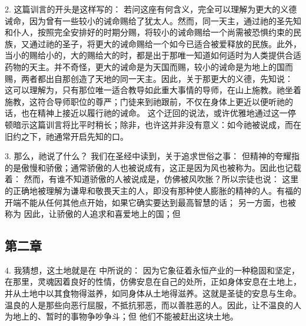 2. 这篇训言的开头是这样写的： 若问这座有何含义，完全可以理解为更大的义德诫命，因为曾有一些较小的诫命赐给了犹太人。然而，同一天主，通过祂的圣先知和仆人，按照完全安排好的时期分赐，将较小的诫命赐给一个尚需被恐惧约束的民族，又通过祂的圣子，将更大的诫命赐给一个如今已适合被爱释放的民族。此外，当小的赐给小的，大的赐给大的时，都是出于那唯一知道如何适时为人类提供合适药物的天主。并不奇怪，更大的诫命是为天国而赐，较小的诫命是为地上的国而赐，两者都出自那创造了天地的同一天主。因此，关于那更大的义德，先知说： 这可以理解为，只有那位唯一适合教导如此重大事情的导师，在山上施教。祂坐着施教，这符合导师职位的尊严；门徒来到祂跟前，不仅在身体上更近以便听祂的话，也在精神上接近以履行祂的诫命。 这个迂回的说法，或许优雅地通过这一停顿暗示这篇训言将比平时稍长；除非，也许这并非没有意义：如今祂被说成，而在旧约之下，祂通常开启先知的口。\par

3. 那么，祂说了什么？ 我们在圣经中读到，关于追求世俗之事： 但精神的夸耀指的是傲慢和骄傲；通常骄傲的人也被说成有，这正是因为风也被称为。因此也记载着： 然而，有谁不知道骄傲的人被说成是，仿佛被风吹胀？所以宗徒也说： 这里的正确地被理解为谦卑和敬畏天主的人，即没有那种使人膨胀的精神的人。有福的开端不能从任何其他点开始，如果它确实要达到最高智慧的话； 另一方面，也被称为 因此，让骄傲的人追求和喜爱地上的国；但\par


\subsection{第二章}

4.  我猜想，这土地就是在  中所说的： 因为它象征着永恒产业的一种稳固和坚定，在那里，灵魂因着良好的性情，仿佛安息在自己的处所，正如身体安息在土地上，并从土地中以其食物得滋养，如同身体从土地得滋养。这就是圣徒的安息与生命。温良的人是那些向恶行屈服，不抵抗邪恶，而以善胜恶的人。因此，让不温良的人为地上的、暂时的事物争吵争斗；但 他们不能被赶出这块土地。\par

